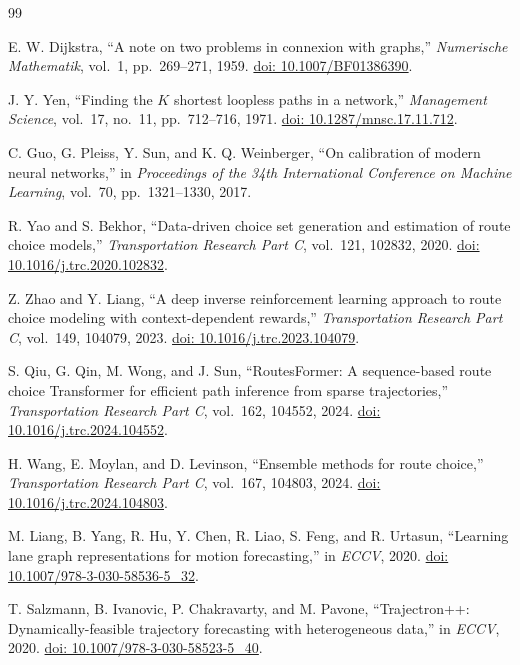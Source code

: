 \documentclass[11pt,letterpaper]{article}
\begin{document}
\begin{thebibliography}{99}

E. W. Dijkstra, ``A note on two problems in connexion with graphs,''
\emph{Numerische Mathematik}, vol.~1, pp.~269--271, 1959.
\href{https://doi.org/10.1007/BF01386390}{doi: 10.1007/BF01386390}.

J. Y. Yen, ``Finding the $K$ shortest loopless paths in a network,''
\emph{Management Science}, vol.~17, no.~11, pp.~712--716, 1971.
\href{https://doi.org/10.1287/mnsc.17.11.712}{doi: 10.1287/mnsc.17.11.712}.

C. Guo, G. Pleiss, Y. Sun, and K. Q. Weinberger,
``On calibration of modern neural networks,'' in \emph{Proceedings of the 34th International Conference on Machine Learning}, vol.~70, pp.~1321--1330, 2017.

R. Yao and S. Bekhor, ``Data-driven choice set generation and estimation of route choice models,''
\emph{Transportation Research Part C}, vol.~121, 102832, 2020.
\href{https://doi.org/10.1016/j.trc.2020.102832}{doi: 10.1016/j.trc.2020.102832}.

Z. Zhao and Y. Liang, ``A deep inverse reinforcement learning approach to route choice modeling with context-dependent rewards,''
\emph{Transportation Research Part C}, vol.~149, 104079, 2023.
\href{https://doi.org/10.1016/j.trc.2023.104079}{doi: 10.1016/j.trc.2023.104079}.

S. Qiu, G. Qin, M. Wong, and J. Sun,
``RoutesFormer: A sequence-based route choice Transformer for efficient path inference from sparse trajectories,''
\emph{Transportation Research Part C}, vol.~162, 104552, 2024.
\href{https://doi.org/10.1016/j.trc.2024.104552}{doi: 10.1016/j.trc.2024.104552}.

H. Wang, E. Moylan, and D. Levinson,
``Ensemble methods for route choice,''
\emph{Transportation Research Part C}, vol.~167, 104803, 2024.
\href{https://doi.org/10.1016/j.trc.2024.104803}{doi: 10.1016/j.trc.2024.104803}.

M. Liang, B. Yang, R. Hu, Y. Chen, R. Liao, S. Feng, and R. Urtasun,
``Learning lane graph representations for motion forecasting,'' in \emph{ECCV}, 2020.
\href{https://doi.org/10.1007/978-3-030-58536-5_32}{doi: 10.1007/978-3-030-58536-5\_32}.

T. Salzmann, B. Ivanovic, P. Chakravarty, and M. Pavone,
``Trajectron++: Dynamically-feasible trajectory forecasting with heterogeneous data,'' in \emph{ECCV}, 2020.
\href{https://doi.org/10.1007/978-3-030-58523-5_40}{doi: 10.1007/978-3-030-58523-5\_40}.


\end{thebibliography}
\end{document}
